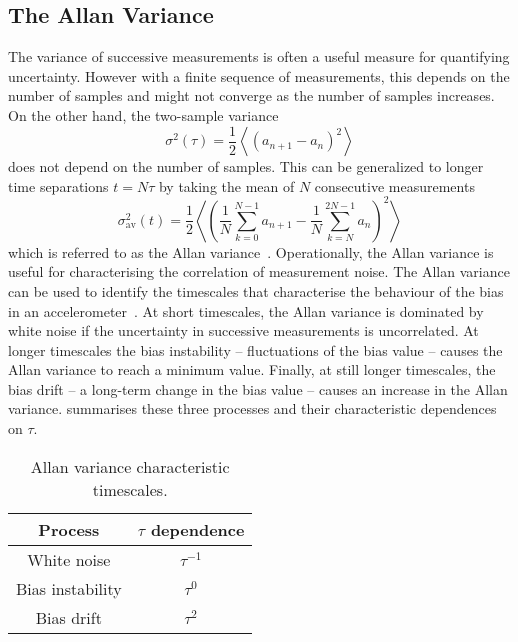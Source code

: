 \subsection{The Allan Variance}\label{subsec:allan_variance}
The variance of successive measurements is often a useful measure for
quantifying uncertainty. However with a finite sequence
of measurements, this depends on the number of samples and might not
converge as the number of samples increases. On the other hand, the
two-sample variance 
\begin{equation}
  \sigma^2(\tau) = \frac{1}{2}\left\langle
  (a_{n+1}-a_n)^2\right\rangle
  \label{eq:two_sample_var}
\end{equation}
does not depend on the number of samples. This can be generalized to
longer time separations \(t = N \tau\) by taking the mean of \(N\)
consecutive measurements
\begin{equation}
  \sigma_\text{av}^2(t) = \frac{1}{2}
  \left\langle
  \left(\frac{1}{N}\sum_{k=0}^{N-1}a_{n+1}-\frac{1}{N}\sum_{k=N}^{2N-1}a_n\right)^2\right\rangle
  \label{eq:allan_var_mean}
\end{equation}
which is referred to as the Allan variance~\cite{Allan1966}. Operationally, the Allan variance is useful for characterising the
correlation of measurement noise. 
The Allan variance can be used to identify the timescales that
characterise the behaviour of the bias in an
accelerometer~\cite{El-Sheimy2008}. At short
timescales, the Allan variance is dominated by white noise if the
uncertainty in successive measurements is uncorrelated. 
At longer timescales the bias instability -- fluctuations of
the bias value -- causes the Allan variance to reach a minimum value.
Finally, at still longer timescales, the bias drift -- a long-term
change in the bias value -- causes
an increase in the Allan variance.  summarises these three processes and their characteristic dependences on $\tau$. 
\begin{table}[htpb]
  \centering
  \begin{tabular}{cc}
  \toprule
    Process & $\tau$ dependence \\ 
    \midrule
    White noise & $\tau^{-1}$ \\
    Bias instability & $\tau^{0}$ \\
    Bias drift & $\tau^{2}$\\
    \bottomrule
  \end{tabular}
  \caption{Allan variance characteristic timescales.}
  \label{tab:avar}
\end{table}

